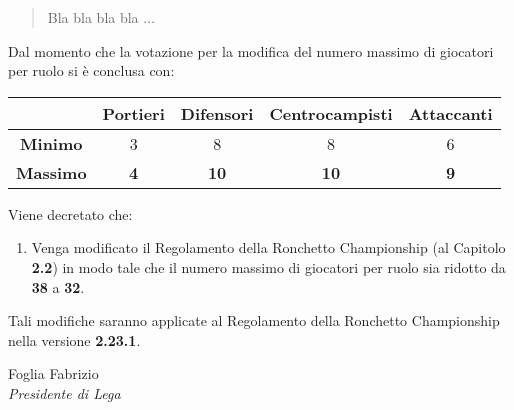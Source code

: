 \documentclass[12pt]{article}
\begin{document}
\begin{quote}
    Bla bla bla bla ...
\end{quote}

Dal momento che la votazione per la modifica del numero massimo di giocatori per ruolo si è conclusa con:
\newline
\\
\begin{tabular}{|c|c|c|c|c|}
    \hline
     & \textbf{Portieri} & \textbf{Difensori} & \textbf{Centrocampisti} & \textbf{Attaccanti} \\
    \hline
    \textbf{Minimo} & 3 & 8 & 8 & 6 \\
    \hline
    \textbf{Massimo} & \textbf{4} & \textbf{10} & \textbf{10} & \textbf{9} \\
    \hline
  \end{tabular}
\newline 

Viene decretato che:
\begin{enumerate}
    \item Venga modificato il Regolamento della Ronchetto Championship (al Capitolo \textbf{2.2}) in modo tale che il numero massimo di giocatori per ruolo sia ridotto da \textbf{38} a \textbf{32}.
\end{enumerate}

Tali modifiche saranno applicate al Regolamento della Ronchetto Championship nella versione \textbf{2.23.1}. 

\begin{flushright}
    \vspace*{\fill}
    Foglia Fabrizio \\ \textit{Presidente di Lega}
    \vspace{0.5cm} %
\end{flushright}
    
\end{document}

